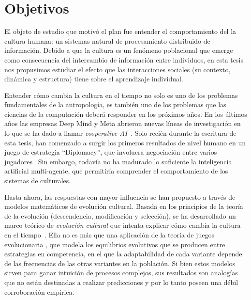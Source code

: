 \documentclass[a4paper,11pt]{book}
\theoremstyle{definition}
\begin{document}
\section{Objetivos}



El objeto de estudio que motivó el plan fue entender el comportamiento del la cultura humana: un sistemas natural de procesamiento distribuido de información.
%
Debido a que la cultura es un fenómeno poblacional que emerge como consecuencia del intercambio de información entre individuos, en esta tesis nos propusimos estudiar el efecto que las interacciones sociales (su contexto, dinámica y estructura) tiene sobre el aprendizaje individual.


Entender cómo cambia la cultura en el tiempo no solo es uno de los problemas fundamentales de la antropología, es también uno de los problemas que las ciencias de la computación deberá responder en los próximos años.
%
En los últimos años las empresas Deep Mind y Meta abrieron nuevas líneas de investigación en lo que se ha dado a llamar \emph{cooperative AI}~\cite{dafoe2020-coopAI, dafoe2021-coopAIcomment}.
%
Solo recién durante la escritura de esta tesis, han comenzado a surgir los primeros resultados de nivel humano en un juego de estrategia ``Diplomacy'', que involucra negociación entre varios jugadores~\cite{kramar2022-deepMindDiplomacy, meta2022-diplomacy}
%
Sin embargo, todavía no ha madurado lo suficiente la inteligencia artificial multi-agente, que permitiría comprender el comportamiento de los sistemas de culturales.


Hasta ahora, las respuestas con mayor influencia se han propuesto a través de modelos matemáticos de evolución cultural.
%
Basada en los principios de la teoría de la evolución (descendencia, modificación y selección), se ha desarrollado un marco teórico de \emph{evolución cultural} que intenta explicar cómo cambia la cultura en el tiempo~\cite{boyd1985-evolutionaryProcess, boyd2005-origin}.
%
Ella no es más que una aplicación de la teoría de juegos evolucionaria \cite{taylor1978-replicatorDynamic, maynardSmith1982-evolutionGameTheory}, que modela los equilibrios evolutivos que se producen entre estrategias en competencia, en el que la adaptabilidad de cada variante depende de las frecuencias de las otras variantes en la población.
%
%
%
Si bien estos modelos sirven para ganar intuición de procesos complejos, sus resultados son analogías que no están destinadas a realizar predicciones y por lo tanto poseen una débil corroboración empírica.
\end{document}
